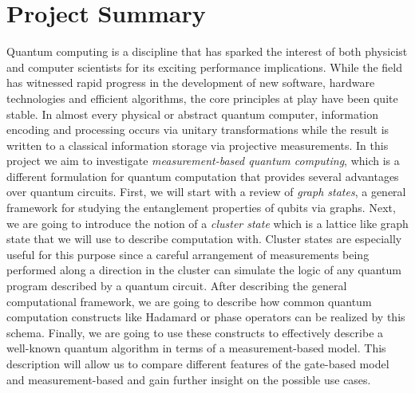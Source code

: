 \section{Project Summary}

Quantum computing is a discipline that has sparked the interest of both physicist and computer scientists for its exciting performance implications. While the field has witnessed rapid progress in the development of new software, hardware technologies and efficient algorithms, the core principles at play have been quite stable. In almost every physical or abstract quantum computer, information encoding and processing occurs via unitary transformations while the result is written to a classical information storage via projective measurements. In this project we aim to investigate \emph{measurement-based quantum computing}, which is a different formulation for quantum computation that provides several advantages over quantum circuits. First, we will start with a review of \emph{graph states}, a general framework for studying the entanglement properties of qubits via graphs. Next, we are going to introduce the notion of a \emph{cluster state} which is a lattice like graph state that we will use to describe computation with. Cluster states are especially useful for this purpose since a careful arrangement of measurements being performed along a direction in the cluster can simulate the logic of any quantum program described by a quantum circuit. After describing the general computational framework, we are going to describe how common quantum computation constructs like Hadamard or phase operators can be realized by this schema. Finally, we are going to use these constructs to effectively describe a well-known quantum algorithm in terms of a measurement-based model. This description will allow us to compare different features of the gate-based model and measurement-based and gain further insight on the possible use cases.